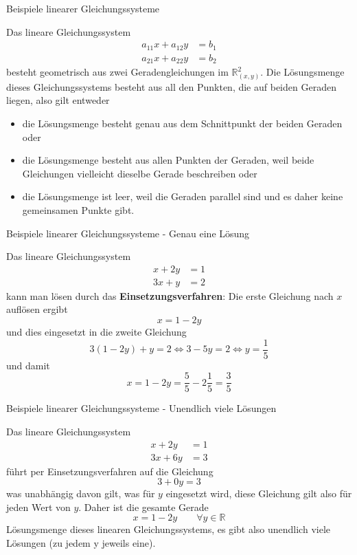 \begin{frame}{Beispiele linearer Gleichungssysteme}
	\begin{example}
		Das lineare Gleichungssystem
		\begin{align*}
		a_{11} x + a_{12} y & = b_1 \\
		a_{21} x + a_{22} y & = b_2
		\end{align*}
		besteht geometrisch aus zwei Geradengleichungen im $\mathbb{R}^{2}_{(x,y)}$. Die Lösungsmenge dieses Gleichungssystems besteht aus all den Punkten, die auf beiden Geraden liegen, also gilt entweder
		\begin{itemize}
			\item die Lösungsmenge besteht genau aus dem Schnittpunkt der beiden Geraden oder
			\item die Lösungsmenge besteht aus allen Punkten der Geraden, weil beide Gleichungen vielleicht dieselbe Gerade beschreiben oder
			\item die Lösungsmenge ist leer, weil die Geraden parallel sind und es daher keine gemeinsamen Punkte gibt.
		\end{itemize}
			
	\end{example}
\end{frame}

\begin{frame}{Beispiele linearer Gleichungssysteme - Genau eine Lösung}
	\begin{example}
		Das lineare Gleichungssystem
		\begin{align*}
		x + 2 y & = 1 \\
		3 x + y & = 2
		\end{align*}
		kann man lösen durch das \textbf{Einsetzungsverfahren}:
		Die erste Gleichung nach $x$ auflösen ergibt
		\[x = 1 - 2 y\]
		und dies eingesetzt in die zweite Gleichung
		\[
		3 (1 - 2y) +y = 2
\Leftrightarrow
		3 - 5 y = 2 \Leftrightarrow y = \frac{1}{5}
		\]
		und damit
		\[
		x = 1 - 2y = \frac{5}{5} - 2\frac{1}{5} = \frac{3}{5}
		\]
	\end{example}
\end{frame}
\begin{frame}{Beispiele linearer Gleichungssysteme - Unendlich viele Lösungen}
	\begin{example}
		Das lineare Gleichungssystem
				\begin{align*}
				x + 2 y & = 1 \\
				3 x +  6 y & = 3
				\end{align*}
		führt per Einsetzungsverfahren auf die Gleichung
		\[
		3  + 0 y= 3
		\]
		was unabhängig davon gilt, was für $y$ eingesetzt wird, diese Gleichung gilt also für jeden Wert von $y$.
		Daher ist die gesamte Gerade
		\[
		x = 1 - 2 y \qquad \forall y \in \mathbb{R}
		\]
		Lösungsmenge dieses linearen Gleichungssystems, es gibt also unendlich viele Lösungen (zu jedem y jeweils eine).
	\end{example}
\end{frame}

